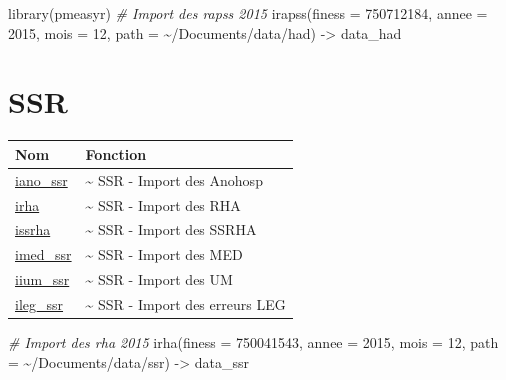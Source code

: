\documentclass[
]{book}
\newenvironment{Shaded}{\begin{snugshade}}{\end{snugshade}}
\newcommand{\AttributeTok}[1]{\textcolor[rgb]{0.77,0.63,0.00}{#1}}
\newcommand{\CommentTok}[1]{\textcolor[rgb]{0.56,0.35,0.01}{\textit{#1}}}
\newcommand{\DecValTok}[1]{\textcolor[rgb]{0.00,0.00,0.81}{#1}}
\newcommand{\FunctionTok}[1]{\textcolor[rgb]{0.00,0.00,0.00}{#1}}
\newcommand{\NormalTok}[1]{#1}
\newcommand{\OtherTok}[1]{\textcolor[rgb]{0.56,0.35,0.01}{#1}}
\newcommand{\StringTok}[1]{\textcolor[rgb]{0.31,0.60,0.02}{#1}}
\begin{document}
\begin{Shaded}
\begin{Highlighting}[]
\FunctionTok{library}\NormalTok{(pmeasyr)}
\CommentTok{\# Import des rapss 2015}
\FunctionTok{irapss}\NormalTok{(}\AttributeTok{finess =} \DecValTok{750712184}\NormalTok{,}
       \AttributeTok{annee =} \DecValTok{2015}\NormalTok{,}
       \AttributeTok{mois =} \DecValTok{12}\NormalTok{,}
       \AttributeTok{path =} \StringTok{\textquotesingle{}\textasciitilde{}/Documents/data/had\textquotesingle{}}\NormalTok{) }\OtherTok{{-}\textgreater{}}\NormalTok{ data\_had}
\end{Highlighting}
\end{Shaded}

\hypertarget{ssr}{%
\section{SSR}\label{ssr}}

\begin{longtable}[]{@{}ll@{}}
\toprule
Nom & Fonction \\
\midrule
\endhead
\href{https://guillaumepressiat.github.io/pmeasyr/reference/iano_ssr.html}{iano\_ssr} & \textasciitilde{} SSR - Import des Anohosp \\
\href{https://guillaumepressiat.github.io/pmeasyr/reference/irha.html}{irha} & \textasciitilde{} SSR - Import des RHA \\
\href{https://guillaumepressiat.github.io/pmeasyr/reference/issrha.html}{issrha} & \textasciitilde{} SSR - Import des SSRHA \\
\href{https://guillaumepressiat.github.io/pmeasyr/reference/imed_ssr.html}{imed\_ssr} & \textasciitilde{} SSR - Import des MED \\
\href{https://guillaumepressiat.github.io/pmeasyr/reference/iium_ssr.html}{iium\_ssr} & \textasciitilde{} SSR - Import des UM \\
\href{https://guillaumepressiat.github.io/pmeasyr/reference/ileg_ssr.html}{ileg\_ssr} & \textasciitilde{} SSR - Import des erreurs LEG \\
\bottomrule
\end{longtable}

\begin{Shaded}
\begin{Highlighting}[]
\CommentTok{\# Import des rha 2015}
\FunctionTok{irha}\NormalTok{(}\AttributeTok{finess =} \DecValTok{750041543}\NormalTok{,}
     \AttributeTok{annee =} \DecValTok{2015}\NormalTok{,}
     \AttributeTok{mois =} \DecValTok{12}\NormalTok{,}
     \AttributeTok{path =} \StringTok{\textquotesingle{}\textasciitilde{}/Documents/data/ssr\textquotesingle{}}\NormalTok{) }\OtherTok{{-}\textgreater{}}\NormalTok{ data\_ssr}
\end{Highlighting}
\end{Shaded}
\end{document}
